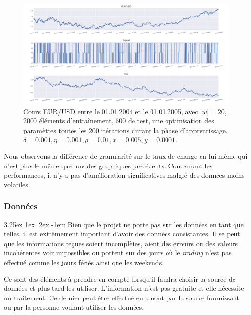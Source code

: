 \documentclass[a4paper, 11pt]{article}
\makeatletter
\renewcommand\paragraph{\@startsection{paragraph}{5}{\z@}%
  {3.25ex \@plus1ex \@minus.2ex}%
  {-1em}%
  {\normalfont\normalsize\bfseries}}
\makeatother
\begin{document}
\begin{figure}
	\centering
		\includegraphics[scale=0.5]{res/eursud_2004-2005-hours}
	\caption{Cours EUR/USD entre le 01.01.2004 et le 01.01.2005, avec $|w| = 20$, $2000$ éléments d'entraînement, $500$ de test, une optimisation des
		paramètres toutes les $200$ itérations durant la phase d'apprentissage, $\delta = 0.001, \eta=0.001,\rho=0.01, x = 0.005, y=0.0001$.}
\end{figure}
\clearpage

Nous observons la différence de granularité sur le taux de change en lui-même qui n'est plus le même que lors des graphiques précédents. Concernant les performances, il n'y a pas d'amélioration significatives malgré des données moins volatiles.

\subsubsection{Données}

\paragraph{}
Bien que le projet ne porte pas sur les données en tant que telles, il est extrêmement important d'avoir des données consistantes. Il se peut que les informations reçues soient incomplètes, aient des erreurs ou des valeurs incohérentes voir impossibles ou portent sur des jours où le \textit{trading} n'est pas effectué comme les jours fériés ainsi que les weekends.

Ce sont des éléments à prendre en compte lorsqu'il faudra choisir la source de données et plus tard les utiliser. L'information n'est pas gratuite et elle nécessite un traitement. Ce dernier peut être effectué en amont par la source fournissant ou par la personne voulant utiliser les données.
\end{document}
